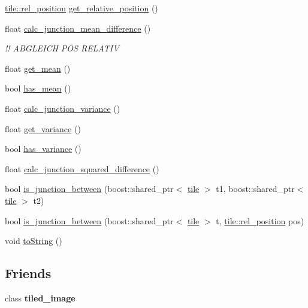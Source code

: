 \begin{DoxyCompactItemize}
\item 
\hyperlink{classtile_a637de74fd50d4b3583b657caa4bf0301}{tile\-::rel\-\_\-position} \hyperlink{classtile__junction_a222e9cb6349da7d2d4110e018cd83ea8}{get\-\_\-relative\-\_\-position} ()
\item 
float \hyperlink{classtile__junction_a9d2e8b1303da7aa81ff193bc0f41698b}{calc\-\_\-junction\-\_\-mean\-\_\-difference} ()
\begin{DoxyCompactList}\small\item\em !! A\-B\-G\-L\-E\-I\-C\-H P\-O\-S R\-E\-L\-A\-T\-I\-V \end{DoxyCompactList}\item 
float \hyperlink{classtile__junction_a4b8bc23606f7563ee9b41c10be9603f1}{get\-\_\-mean} ()
\item 
bool \hyperlink{classtile__junction_a60d08274e74382906b010c5e599b9d51}{has\-\_\-mean} ()
\item 
float \hyperlink{classtile__junction_a102b5e0b0cb510cbe20a8c13c80cbbcd}{calc\-\_\-junction\-\_\-variance} ()
\item 
float \hyperlink{classtile__junction_a5e9c45d6920446d2231fb1f37b91671b}{get\-\_\-variance} ()
\item 
bool \hyperlink{classtile__junction_a65d3be341735ee1dfaf64875cc3d3ea8}{has\-\_\-variance} ()
\item 
float \hyperlink{classtile__junction_aa0c50934755f155de45cbb723cb2c2c0}{calc\-\_\-junction\-\_\-squared\-\_\-difference} ()
\item 
bool \hyperlink{classtile__junction_a521b989aca823f04ac432484de5307a0}{is\-\_\-junction\-\_\-between} (boost\-::shared\-\_\-ptr$<$ \hyperlink{classtile}{tile} $>$ t1, boost\-::shared\-\_\-ptr$<$ \hyperlink{classtile}{tile} $>$ t2)
\item 
bool \hyperlink{classtile__junction_a113ddf352ff4c8743ac0dbd2e10cc796}{is\-\_\-junction\-\_\-between} (boost\-::shared\-\_\-ptr$<$ \hyperlink{classtile}{tile} $>$ t, \hyperlink{classtile_a637de74fd50d4b3583b657caa4bf0301}{tile\-::rel\-\_\-position} pos)
\item 
void \hyperlink{classtile__junction_ab8d78bac6a8173133d4b12db4672dfc7}{to\-String} ()
\end{DoxyCompactItemize}
\subsection*{Friends}
\begin{DoxyCompactItemize}
\item 
\hypertarget{classtile__junction_a82299213a6cc9d5d3fcbdaeb80060be7}{class {\bfseries tiled\-\_\-image}}\label{classtile__junction_a82299213a6cc9d5d3fcbdaeb80060be7}

\end{DoxyCompactItemize}


